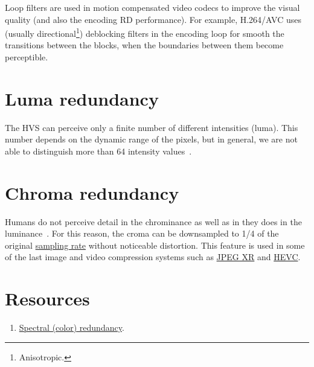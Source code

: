 Loop filters are used in motion compensated video codecs to improve
the visual quality (and also the encoding RD performance). For
example, H.264/AVC uses (usually directional\footnote{Anisotropic.})
deblocking filters in the encoding loop for smooth the transitions
between the blocks, when the boundaries between them become
perceptible.

\section{Luma redundancy}

The HVS can perceive only a finite number of different intensities
(luma). This number depends on the dynamic range of the pixels, but in
general, we are not able to distinguish more than 64 intensity
values~\cite{vruiz__visual_redundancy}.

\section{Chroma redundancy}

Humans do not perceive detail in the chrominance as well as in they
does in the luminance~\cite{burger2016digital}. For this reason, the
croma can be downsampled to 1/4 of the original
\href{https://en.wikipedia.org/wiki/Sampling_(signal_processing)}{sampling
  rate} without noticeable distortion. This feature is used in some of
the last image and video compression systems such as
\href{https://en.wikipedia.org/wiki/JPEG_XR#Description}{JPEG XR} and
\href{https://en.wikipedia.org/wiki/High_Efficiency_Video_Coding#Video_coding_layer}{HEVC}.

\section{Resources}
\begin{enumerate}
\item \href{https://github.com/vicente-gonzalez-ruiz/color_transforms/blob/main/docs/color_redundancy.ipynb}{Spectral
    (color) redundancy}.
\end{enumerate}

